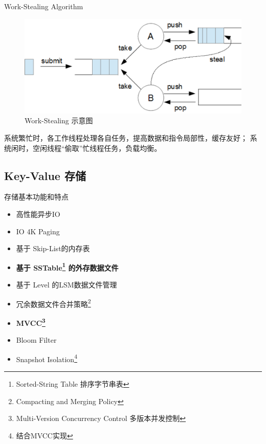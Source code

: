 \documentclass{beamer}
\begin{document}
\begin{frame}{Work-Stealing Algorithm}
    \begin{figure}
        \centering
        \includegraphics[width=0.8\linewidth]{pic/work_stealing.png}
        \caption{Work-Stealing 示意图}
    \end{figure}

    系统繁忙时，各工作线程处理各自任务，提高数据和指令局部性，缓存友好；
    系统闲时，空闲线程“偷取”忙线程任务，负载均衡。
\end{frame}

\subsection{Key-Value 存储}

\begin{frame}{存储基本功能和特点}
	\begin{itemize}
        \item 高性能异步IO\cite{crotty_are_2022}
        \item IO 4K Paging
        \item 基于 Skip-List\cite{pugh_skip_1990}的内存表
        \item \textbf{基于 SSTable\footnote{Sorted-String Table 排序字节串表} 的外存数据文件}
        \item 基于 Level 的LSM\cite{oneil_log-structured_1996}数据文件管理
        \item 冗余数据文件合并策略\footnote{Compacting and Merging Policy}
        \item \textbf{MVCC\footnote{Multi-Version Concurrency Control 多版本并发控制}}
        \item Bloom Filter\cite{burton_h_bloom_spacetime_1970}
        \item Snapshot Isolation\footnote{结合MVCC实现}
	\end{itemize}
\end{frame}
\end{document}
